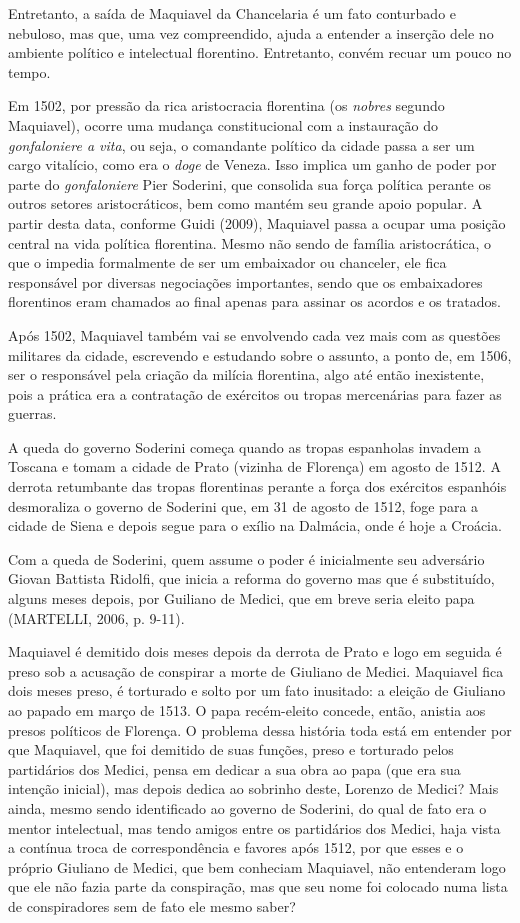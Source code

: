 Entretanto, a saída de Maquiavel da Chancelaria é um fato conturbado e
nebuloso, mas que, uma vez compreendido, ajuda a entender a inserção
dele no ambiente político e intelectual florentino. Entretanto, convém
recuar um pouco no tempo.

Em 1502, por pressão da rica aristocracia florentina (os \emph{nobres}
segundo Maquiavel), ocorre uma mudança constitucional com a instauração
do \emph{gonfaloniere a vita}, ou seja, o comandante político da cidade
passa a ser um cargo vitalício, como era o \emph{doge} de Veneza. Isso
implica um ganho de poder por parte do \emph{gonfaloniere} Pier
Soderini, que consolida sua força política perante os outros setores
aristocráticos, bem como mantém seu grande apoio popular. A partir desta
data, conforme Guidi (2009), Maquiavel passa a ocupar uma posição
central na vida política florentina. Mesmo não sendo de família
aristocrática, o que o impedia formalmente de ser um embaixador ou
chanceler, ele fica responsável por diversas negociações importantes,
sendo que os embaixadores florentinos eram chamados ao final apenas para
assinar os acordos e os tratados.

Após 1502, Maquiavel também vai se envolvendo cada vez mais com as
questões militares da cidade, escrevendo e estudando sobre o assunto, a
ponto de, em 1506, ser o responsável pela criação da milícia florentina,
algo até então inexistente, pois a prática era a contratação de
exércitos ou tropas mercenárias para fazer as guerras.

A queda do governo Soderini começa quando as tropas espanholas invadem a
Toscana e tomam a cidade de Prato (vizinha de Florença) em agosto de
1512. A derrota retumbante das tropas florentinas perante a força dos
exércitos espanhóis desmoraliza o governo de Soderini que, em 31 de
agosto de 1512, foge para a cidade de Siena e depois segue para o exílio
na Dalmácia, onde é hoje a Croácia.

Com a queda de Soderini, quem assume o poder é inicialmente seu
adversário Giovan Battista Ridolfi, que inicia a reforma do governo mas
que é substituído, alguns meses depois, por Guiliano de Medici, que em
breve seria eleito papa (MARTELLI, 2006, p. 9-11).

Maquiavel é demitido dois meses depois da derrota de Prato e logo em
seguida é preso sob a acusação de conspirar a morte de Giuliano de
Medici. Maquiavel fica dois meses preso, é torturado e solto por um fato
inusitado: a eleição de Giuliano ao papado em março de 1513. O papa
recém-eleito concede, então, anistia aos presos políticos de Florença. O
problema dessa história toda está em entender por que Maquiavel, que foi
demitido de suas funções, preso e torturado pelos partidários dos
Medici, pensa em dedicar a sua obra ao papa (que era sua intenção
inicial), mas depois dedica ao sobrinho deste, Lorenzo de Medici? Mais
ainda, mesmo sendo identificado ao governo de Soderini, do qual de fato
era o mentor intelectual, mas tendo amigos entre os partidários dos
Medici, haja vista a contínua troca de correspondência e favores após
1512, por que esses e o próprio Giuliano de Medici, que bem conheciam
Maquiavel, não entenderam logo que ele não fazia parte da conspiração,
mas que seu nome foi colocado numa lista de conspiradores sem de fato
ele mesmo saber?

